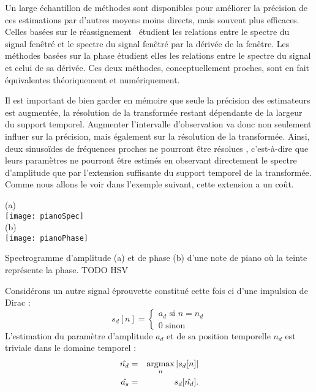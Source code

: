 Un large échantillon de méthodes sont disponibles pour améliorer la précision de ces estimations par d'autres moyens moins directs, mais souvent plus efficaces. Celles basées sur le réassignement~\cite{auger1995improving} étudient les relations entre le spectre du signal fenêtré et le spectre du signal fenêtré par la dérivée de la fenêtre. Les méthodes basées sur la phase étudient elles les relations entre le spectre du signal et celui de sa dérivée. Ces deux méthodes, conceptuellement proches, sont en fait équivalentes théoriquement et numériquement.~\cite{lagrangeJaes07}

Il est important de bien garder en mémoire que seule la précision des estimateurs est augmentée, la résolution de la transformée restant dépendante de la largeur du support temporel.  Augmenter l'intervalle d'observation va donc non seulement influer sur la précision, mais également sur la résolution de la transformée. Ainsi, deux sinusoïdes de fréquences proches ne pourront être \og résolues \fg, c'est-à-dire que leurs paramètres ne pourront être estimés en observant directement le spectre d'amplitude que par l'extension suffisante du support temporel de la transformée. Comme nous allons le voir dans l'exemple suivant, cette extension a un coût.


\begin{marginfigure}
  \footnotesize
  \begin{center}
  (a) \\
  \texttt{[image: pianoSpec]} \\
  (b) \\
  \texttt{[image: pianoPhase]} \\
\end{center}
  \caption{Spectrogramme d'amplitude (a) et de phase (b) d'une note de piano où la teinte représente la phase. TODO HSV}
  \label{fig:phase}
\end{marginfigure}

Considérons un autre signal \og éprouvette \fg constitué cette fois ci d'une impulsion de Dirac :
\begin{equation}
  s_d[n] = \begin{cases}
    a_d \text{ si } n=n_d \\
    0 \text{ sinon}
\end{cases}
\end{equation}
L'estimation du paramètre d'amplitude $a_d$ et de sa position temporelle $n_d$ est triviale dans le domaine temporel :
\begin{eqnarray}
  \hat{n_d} &=&  \operatorname*{argmax}_n | s_d[n] | \\
  \hat{a_s} &=&  s_d[\hat{n_d}].
\end{eqnarray}

